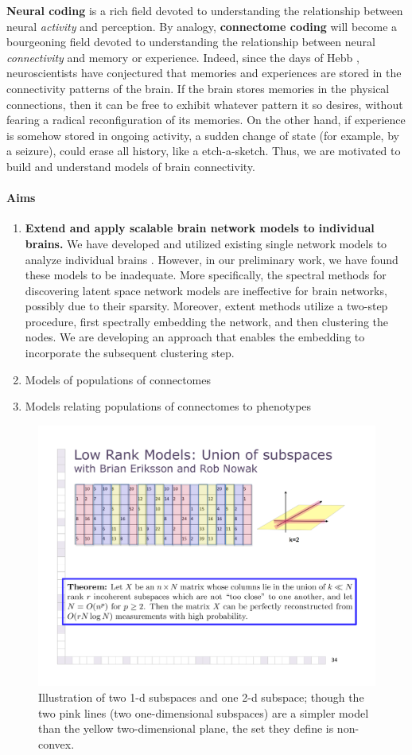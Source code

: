 \documentclass[times,11pt]{article} %
\begin{document}
\textbf{Neural coding} is a rich field devoted to understanding the relationship between neural \emph{activity} and perception.  By analogy, \textbf{connectome coding} will become a bourgeoning field devoted to understanding the relationship between neural \emph{connectivity} and memory or  experience.  Indeed, since the days of Hebb \cite{??}, neuroscientists have conjectured that memories and experiences are stored in the connectivity patterns of the brain.  If the brain stores memories in the physical connections, then it can be free to exhibit whatever pattern it so desires, without fearing a radical reconfiguration of its memories.  On the other hand, if experience is somehow stored in ongoing activity, a sudden change of state (for example, by a seizure), could erase all history, like a etch-a-sketch.   Thus, we are motivated to build and understand models of brain connectivity. 

\paragraph{Aims}

\begin{enumerate}
	\item \textbf{Extend and apply scalable brain network models to individual brains.}  We have developed and utilized existing single network models to analyze individual brains \cite{??}.  However, in our preliminary work, we have found these models to be inadequate. More specifically, the spectral methods for discovering latent space network models are ineffective for brain networks, possibly due to their sparsity.  Moreover, extent methods utilize a two-step procedure, first spectrally embedding the network, and then clustering the nodes.  We are developing an approach that enables the embedding to incorporate the subsequent clustering step.    
	\item Models of populations of connectomes
	\item Models relating populations of connectomes to phenotypes
\end{enumerate}



\begin{figure}
\centering
\includegraphics[width=.4\textwidth]{figs/unionspic}
\caption{\small Illustration of two 1-d subspaces and one 2-d subspace; though the two pink lines (two one-dimensional subspaces) are a simpler model than the yellow two-dimensional plane, the set they define is non-convex.}
\label{fig:unionsum}
\end{figure}
\end{document}
